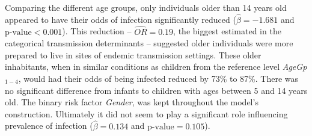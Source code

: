 Comparing the different age groups, only individuals older than 14 years old appeared to have their odds of infection significantly reduced ($\widehat{\beta}=-1.681$ and $\text{p-value}<0.001$).
This reduction -- $\widehat{OR}=0.19$, the biggest estimated in the categorical transmission determinants -- suggested older individuals were more prepared to live in sites of endemic transmission settings.
These older inhabitants, when in similar conditions as children from the reference level \textit{AgeGp}$_{1-4}$, would had their odds of being infected reduced by 73\% to 87\%.
There was no significant difference from infants to children with ages between 5 and 14 years old.
The binary risk factor \textit{Gender}, was kept throughout the model's construction.
Ultimately it did not seem to play a significant role influencing prevalence of infection ($\widehat{\beta}=0.134$ and $\text{p-value}=0.105$).

